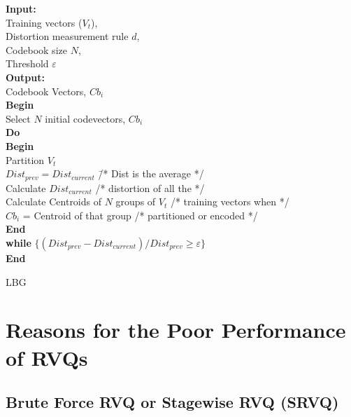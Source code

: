 \begin{alg}
\begin{tabbing}
{\bf Input:} \=  \\ 
    \> Training vectors ($V_t$), \\
    \> Distortion measurement rule $d$, \\
    \> Codebook size $N$, \\
    \> Threshold $\varepsilon$ \\
{\bf Output: } \\
 \> Codebook Vectors, $Cb_i$  \\
{\bf Begin} \\
 \> Select $N$ initial codevectors, $Cb_i$  \\
 \> {\bf Do} \= \\
 \> \> {\bf Begin} \= \\
 \> \> \> Partition $V_t$ \\
 \> \> \> $Dist_{prev} = Dist_{current}$ \hspace{1.2in}\=/* Dist is the average */ \\
 \> \> \> Calculate $Dist_{current}$ \> /* distortion of all the */ \\
 \> \> \> Calculate Centroids of $N$ groups of $V_t$ \> /* training vectors when */\\
 \> \> \> $Cb_i$ = Centroid of that group \> /* partitioned or encoded */ \\
 \> \> {\bf End} \\
 \> {\bf while} $\{(Dist_{prev} - Dist_{current})/Dist_{prev} \geq \varepsilon\}$ \\
{\bf End} \\
\end{tabbing}
\caption{LBG}
\label{alg:LBG}
\end{alg}

\section{Reasons for the Poor Performance of RVQs}

\subsection{Brute Force RVQ or Stagewise RVQ (SRVQ)}


